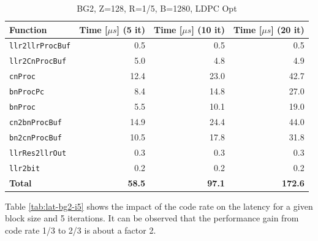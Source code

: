 \documentclass{article}
\begin{document}
\begin{table}[ht]
  \centering
  \begin{tabular}{lrrr}
    \toprule
    \textbf{Function} & \textbf{Time [$\mu s$] (5 it)} & \textbf{Time [$\mu s$] (10 it)} & \textbf{Time [$\mu s$] (20 it)}\\
    \midrule
    \texttt{llr2llrProcBuf} & 0.5  & 0.5  & 0.5  \\
    \texttt{llr2CnProcBuf}  & 5.0  & 4.8  & 4.9  \\
    \texttt{cnProc}         & 12.4 & 23.0 & 42.7 \\
    \texttt{bnProcPc}       & 8.4  & 14.8 & 27.0 \\
    \texttt{bnProc}         & 5.5  & 10.1 & 19.0 \\
    \texttt{cn2bnProcBuf}   & 14.9 & 24.4 & 44.0 \\
    \texttt{bn2cnProcBuf}   & 10.5 & 17.8 & 31.8 \\
    \texttt{llrRes2llrOut}  & 0.3  & 0.3  & 0.3  \\
    \texttt{llr2bit}        & 0.2  & 0.2  & 0.2  \\
    \midrule
    \textbf{Total}          & \textbf{58.5} & \textbf{97.1} & \textbf{172.6} \\
    \bottomrule
  \end{tabular}
  \caption{BG2, Z=128, R=1/5, B=1280, LDPC Opt}
  \label{tab:lat-bg2-r15}
\end{table}

Table \ref{tab:lat-bg2-i5} shows the impact of the code rate on the latency for a given block size and 5 iterations. It can be observed that the performance gain from code rate 1/3 to 2/3 is about a factor 2.
\end{document}
